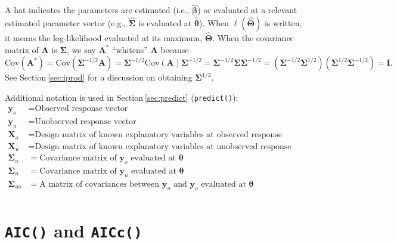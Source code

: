\documentclass{article}
\begin{document}
A hat indicates the parameters are estimated (i.e.,
\(\hat{\boldsymbol{\beta}}\)) or evaluated at a relevant estimated
parameter vector (e.g., \(\hat{\boldsymbol{\Sigma}}\) is evaluated at
\(\hat{\boldsymbol{\theta}}\)). When \(\ell(\boldsymbol{\hat{\Theta}})\)
is written, it means the log-likelihood evaluated at its maximum,
\(\boldsymbol{\hat{\Theta}}\). When the covariance matrix of
\(\mathbf{A}\) is \(\boldsymbol{\Sigma}\), we say \(\mathbf{A}^*\)
``whitens'' \(\mathbf{A}\) because \begin{equation*}
\text{Cov}(\mathbf{A}^*) = \text{Cov}(\boldsymbol{\Sigma}^{-1/2}\mathbf{A}) = \boldsymbol{\Sigma}^{-1/2}\text{Cov}(\mathbf{A})\boldsymbol{\Sigma}^{-1/2} = \boldsymbol{\Sigma}^{-1/2}\boldsymbol{\Sigma} \boldsymbol{\Sigma}^{-1/2} = (\boldsymbol{\Sigma}^{-1/2}\boldsymbol{\Sigma}^{1/2})(\boldsymbol{\Sigma}^{1/2}\boldsymbol{\Sigma}^{-1/2}) = \mathbf{I}.
\end{equation*} See Section\(~\)\ref{sec:iprod} for a discussion on
obtaining \(\boldsymbol{\Sigma}^{1/2}\).

Additional notation is used in Section\(~\)\ref{sec:predict}
(\texttt{predict()}): \begin{equation*}
  \begin{split}
   \mathbf{y}_o & = \text{Observed response vector} \\
   \mathbf{y}_u & = \text{Unobserved response vector} \\
   \mathbf{X}_o & = \text{Design matrix of known explanatory variables at observed response variable locations} \\
   \mathbf{X}_u & = \text{Design matrix of known explanatory variables at unobserved response variable locations} \\
   \boldsymbol{\Sigma}_o & = \text{Covariance matrix of $\mathbf{y}_o$ evaluated at } \boldsymbol{\theta} \\
   \boldsymbol{\Sigma}_u & = \text{Covariance matrix of $\mathbf{y}_u$ evaluated at } \boldsymbol{\theta} \\
   \boldsymbol{\Sigma}_{uo} & = \text{A matrix of covariances between $\mathbf{y}_u$ and $\mathbf{y}_o$ evaluated at } \boldsymbol{\theta} \\
  \end{split}
\end{equation*}

\hypertarget{sec:aic}{%
\section{\texorpdfstring{\texttt{AIC()} and
\texttt{AICc()}}{AIC() and AICc()}}\label{sec:aic}}
\end{document}

